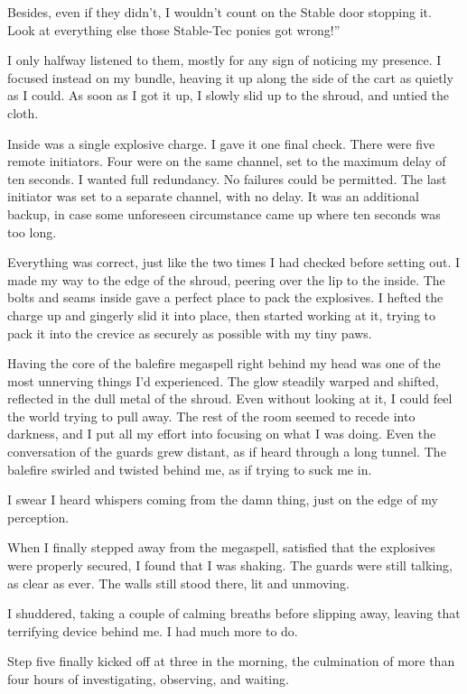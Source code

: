 \leavevmode{}Besides, even if they didn’t, I wouldn’t count on the Stable door stopping it. Look at everything else those Stable-Tec ponies got wrong!”

I only halfway listened to them, mostly for any sign of noticing my presence. I focused instead on my bundle, heaving it up along the side of the cart as quietly as I could. As soon as I got it up, I slowly slid up to the shroud, and untied the cloth.

Inside was a single explosive charge. I gave it one final check. There were five remote initiators. Four were on the same channel, set to the maximum delay of ten seconds. I wanted full redundancy. No failures could be permitted. The last initiator was set to a separate channel, with no delay. It was an additional backup, in case some unforeseen circumstance came up where ten seconds was too long.

Everything was correct, just like the two times I had checked before setting out. I made my way to the edge of the shroud, peering over the lip to the inside. The bolts and seams inside gave a perfect place to pack the explosives. I hefted the charge up and gingerly slid it into place, then started working at it, trying to pack it into the crevice as securely as possible with my tiny paws.

Having the core of the balefire megaspell right behind my head was one of the most unnerving things I’d experienced. The glow steadily warped and shifted, reflected in the dull metal of the shroud. Even without looking at it, I could feel the world trying to pull away. The rest of the room seemed to recede into darkness, and I put all my effort into focusing on what I was doing. Even the conversation of the guards grew distant, as if heard through a long tunnel. The balefire swirled and twisted behind me, as if trying to suck me in.

I swear I heard whispers coming from the damn thing, just on the edge of my perception.

When I finally stepped away from the megaspell, satisfied that the explosives were properly secured, I found that I was shaking. The guards were still talking, as clear as ever. The walls still stood there, lit and unmoving.

I shuddered, taking a couple of calming breaths before slipping away, leaving that terrifying device behind me. I had much more to do.

{\br}%
Step five finally kicked off at three in the morning, the culmination of more than four hours of investigating, observing, and waiting.

